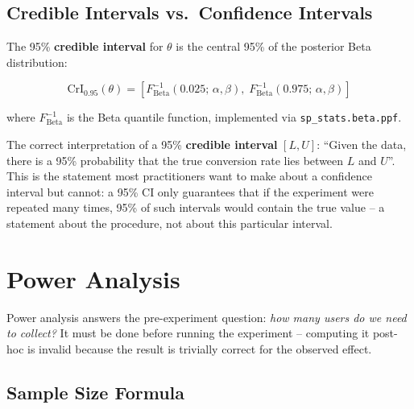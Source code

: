 \subsection{Credible Intervals vs.\ Confidence Intervals}

The 95\% \textbf{credible interval} for $\theta$ is the central 95\% of the
posterior Beta distribution:

\begin{equation}
  \mathrm{CrI}_{0.95}(\theta) = \left[F^{-1}_{\mathrm{Beta}}(0.025;\, \alpha, \beta),\;
    F^{-1}_{\mathrm{Beta}}(0.975;\, \alpha, \beta)\right]
  \label{eq:credible-interval}
\end{equation}

where $F^{-1}_{\mathrm{Beta}}$ is the Beta quantile function, implemented via
\texttt{sp\_stats.beta.ppf}.

\begin{keyinsight}
  The correct interpretation of a 95\% \textbf{credible interval}
  $[L, U]$: ``Given the data, there is a 95\% probability that the true
  conversion rate lies between $L$ and $U$''. This is the statement most
  practitioners want to make about a confidence interval but cannot: a 95\% CI
  only guarantees that if the experiment were repeated many times, 95\% of
  such intervals would contain the true value -- a statement about the
  procedure, not about this particular interval.
\end{keyinsight}

\section{Power Analysis}
\label{sec:abtest-power}


Power analysis answers the pre-experiment question: \emph{how many users do we
need to collect?} It must be done before running the experiment -- computing it
post-hoc is invalid because the result is trivially correct for the observed
effect.

\subsection{Sample Size Formula}


